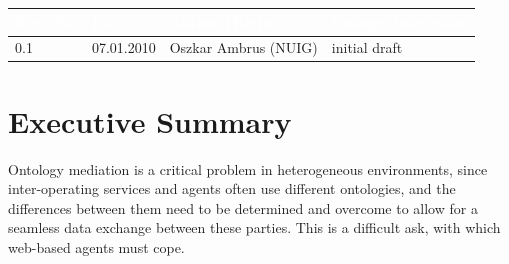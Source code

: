 \documentclass{fast_latex}
\begin{document}
\begin{small}
\begin{tabular}{|l|l|l|p{7.5cm}|}
\hline
\rowcolor{fast@lightgrey}\textcolor{white}{\textbf{Rev. No.}} &
                            \textcolor{white}{\textbf{Date}} &
                            \textcolor{white}{\textbf{Author (Partner)}} &
                            \textcolor{white}{\textbf{Change description}}\\ \hline
0.1 & 07.01.2010 & Oszkar Ambrus (NUIG) & initial draft \\ \hline
\end{tabular}
\end{small}

\color{black}

\vfill

\newpage


\clearpage

\section*{Executive Summary}
\doublespacing
Ontology mediation is a critical problem in heterogeneous environments, since inter-operating services and agents often use different
ontologies, and the differences between them need to be determined and overcome to allow for a seamless data exchange between these parties.
This is a difficult ask, with which web-based agents must cope. 
\end{document}
